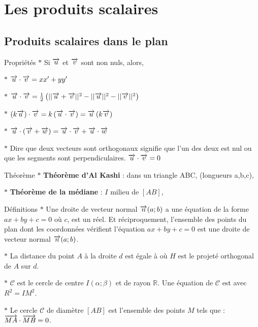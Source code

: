 \section{Les produits scalaires}
\subsection{Produits scalaires dans le plan}
\begin{bclogo}{Propriétés}
$\ast$ Si $\overrightarrow{u}$ et $\overrightarrow{v}$ sont non nuls, alors, 

$\ast$ $\overrightarrow{u}\cdot \overrightarrow{v}=xx'+yy'$

$\ast$ $\overrightarrow{u}\cdot \overrightarrow{v}=\frac{1}{2}\left( ||\overrightarrow{u}+\overrightarrow{v}||^2-||\overrightarrow{u}||^2-||\overrightarrow{v}||^2\right) $

$\ast$ $\left( k\overrightarrow{u}\right) \cdot \overrightarrow{v}=k\left( \overrightarrow{u}\cdot \overrightarrow{v}\right) =\overrightarrow{u}\left( k\overrightarrow{v}\right)$ 

$\ast$ $\overrightarrow{u}\cdot \left( \overrightarrow{v}+\overrightarrow{w}\right)=\overrightarrow{u}\cdot \overrightarrow{v}+\overrightarrow{u}\cdot \overrightarrow{w}$ 

$\ast$ Dire que deux vecteurs sont orthogonaux signifie que l'un des deux est nul ou que les segments sont perpendiculaires. $\overrightarrow{u}\cdot \overrightarrow{v}=0$
\end{bclogo}

\medskip

\begin{bclogo}{Théorème}
$\ast$ \textbf{Théorème d'Al Kashi} : dans un triangle ABC, (longueurs a,b,c), 

$\ast$ \textbf{Théorème de la médiane} : $I$ milieu de $\left[AB\right]$, 
\end{bclogo} 

\medskip

\begin{bclogo}{Définitions}
$\ast$ Une droite de vecteur normal $\overrightarrow{n}(a;b)$ a une équation de la forme $ax+by+c=0$ où $c$, est un réel. Et réciproquement, l'ensemble des points du plan dont les coordonnées vérifient l'équation $ax+by+c=0$ est une droite de vecteur normal $\overrightarrow{n}(a;b)$.

$\ast$ La distance du point $A$ à la droite $d$ est égale à 
 où $H$ est le projeté orthogonal de $A$ sur $d$.

$\ast$ $\mathcal{C}$ est le cercle de centre $I(\alpha ;\beta )$ et de rayon $\mathbb{R}$. Une équation de $\mathcal{C}$ est  
avec $R^2=IM^2$.

$\ast$ Le cercle $\mathcal{C}$ de diamètre $\left[ AB\right]$  est l'ensemble des points $M$ tels que : $\overrightarrow{MA}\cdot \overrightarrow{MB}=0$.
\end{bclogo} 

